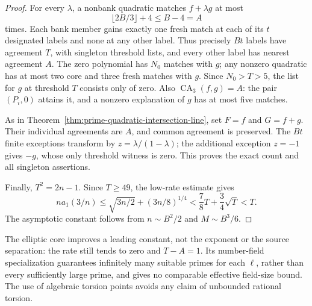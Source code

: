 \begin{proof}
For every $\lambda$, a nonbank quadratic matches $f+\lambda g$ at most
\[
 \lfloor2B/3\rfloor+4\le B-4=A
\]
times. Each bank member gains exactly one fresh match at each of its
$t$ designated labels and none at any other label. Thus precisely $Bt$
labels have agreement $T$, with singleton threshold lists, and every
other label has nearest agreement $A$.
The zero polynomial has $N_0$ matches with $g$; any nonzero quadratic
has at most two core and three fresh matches with $g$. Since $N_0>T>5$,
the list for $g$ at threshold $T$ consists only of zero. Also
$\operatorname{CA}_3(f,g)=A$: the pair $(P_i,0)$ attains it, and a
nonzero explanation of $g$ has at most five matches.

As in Theorem~\ref{thm:prime-quadratic-intersection-line}, set
$F=f$ and $G=f+g$. Their individual agreements are $A$, and common
agreement is preserved. The $Bt$ finite exceptions transform by
$z=\lambda/(1-\lambda)$; the additional exception $z=-1$ gives $-g$,
whose only threshold witness is zero. This proves the exact count and
all singleton assertions.

Finally, $T^2=2n-1$. Since $T\ge49$, the low-rate estimate gives
\[
 na_1(3/n)\le\sqrt{3n/2}+(3n/8)^{1/4}
 <\frac78T+\frac34\sqrt T<T.
\]
The asymptotic constant follows from $n\sim B^2/2$ and $M\sim B^3/6$.
\end{proof}

The elliptic core improves a leading constant, not the exponent or the
source separation: the rate still tends to zero and $T-A=1$.
Its number-field specialization guarantees infinitely many suitable
primes for each $\ell$, rather than every sufficiently large prime,
and gives no comparable effective field-size bound. The use of
algebraic torsion points avoids any claim of unbounded rational torsion.
